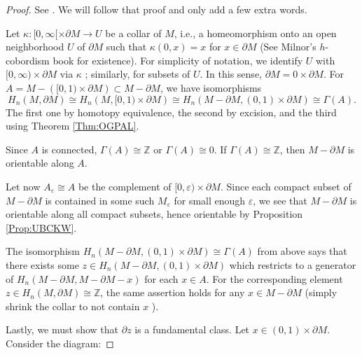 \documentclass[reqno]{amsart}
\theoremstyle{definition}
\theoremstyle{remark}
\begin{document}
\begin{proof}
    See \cite[Thm 16.5.1]{Dieck}. We will follow that
    proof and only add a few extra words.

    Let $\kappa \colon [0, \infty [ \times \partial M \to U$
    be a collar of $M$, i.e., a homeomorphism
    onto an open neighborhood $U$ of $\partial M$ such that
    $\kappa (0,x) = x$ for $x \in \partial M$ (See Milnor's
    $h$-cobordism book for existence).
    For simplicity of notation, we
    identify $U$ with $[0, \infty ) \times \partial M$ via
    $\kappa$ ; similarly, for subsets of $U$.
    In this sense, $\partial M = 0 \times \partial M$.
    For
    $A = M - \left( [0,1) \times \partial M \right) 
    \subset M - \partial M$, we have isomorphisms
    \[
    H_n \left( M, \partial M \right) \cong
    H_n \left( M, [0,1) \times \partial M \right) 
    \cong
    H_n \left( M - \partial M, (0,1) \times \partial M \right) 
    \cong \Gamma (A).
    \] 
    The first one by homotopy equivalence, the second by
    excision, and the third using Theorem
    \ref{Thm:OGPAL}.

    Since $A$ is connected, 
    $\Gamma (A) \cong \mathbb{Z}$ or 
    $\Gamma (A) \cong 0$. If 
    $\Gamma(A) \cong \mathbb{Z}$, then
    $M - \partial M$ is orientable along $A$.

    Let now $A_{\varepsilon} \cong A$ be the complement
    of $[0, \varepsilon) \times \partial M$. Since
    each compact subset of $M - \partial M$ is
    contained in some such $M_{\varepsilon}$ for small enough
    $\varepsilon$, we see that $M - \partial M$ is orientable
    along all compact subsets, hence
    orientable by Proposition \ref{Prop:UBCKW}.

    The isomorphism 
    $H_n \left( M - \partial M, 
    \left( 0,1 \right)  \times \partial M \right) \cong
    \Gamma(A)$ from above says that there exists
    some $z \in H_n \left( M - \partial M,
    \left( 0,1 \right) \times \partial M \right) $ which restricts
    to a generator of $H_n \left( M - \partial M,
    M - \partial M - x\right) $ for each $x \in A$.
    For the corresponding element
    $z \in H_n \left( M, \partial M \right) \cong
    \mathbb{Z}$, the same assertion holds
    for any $x \in M - \partial M$ (simply shrink the collar
    to not contain $x$ ).

    Lastly, we must show that $\partial z$ is a fundamental class.
    Let $x \in \left( 0,1 \right) \times \partial M$.
    Consider the diagram:


\end{proof}
\end{document}
